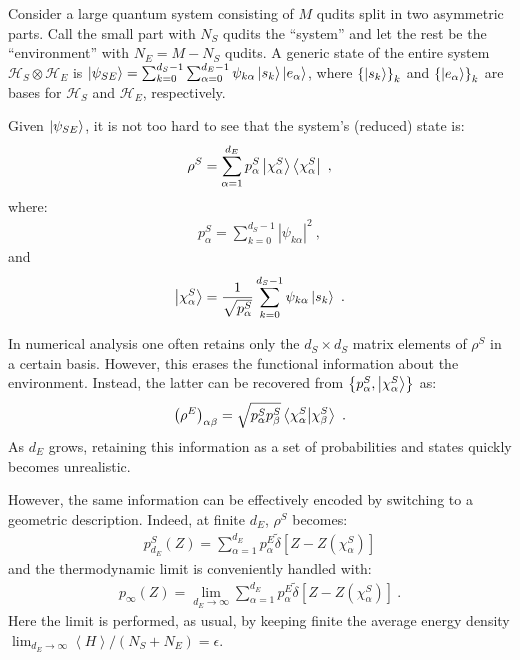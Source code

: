 \documentclass[nofootinbib,pre,twocolumn,showpacs,showkeys,groupaddress,preprintnumbers,floatfix]{revtex4-1}
\newcommand{\1}{\mathbbm{1}}
\newcommand{\MV}[1]{\left\langle #1 \right\rangle}
\begin{document}
Consider a large quantum system consisting of $M$ qudits split in two
asymmetric parts. Call the small part with $N_S$ qudits the ``system'' and
let the rest be the ``environment'' with $N_E = M-N_S$ qudits. A generic state
of the entire system $\mathcal{H}_S \otimes \mathcal{H}_E$ is $\ket{\psi_{SE}}
= \sum_{k=0}^{d_S-1}\sum_{\alpha=0}^{d_E-1}
\psi_{k\alpha}\ket{s_k}\ket{e_\alpha}$, where $\left\{\ket{s_k}\right\}_k$ and
$\left\{\ket{e_\alpha}\right\}_k$ are bases for $\mathcal{H}_S$ and
$\mathcal{H}_E$, respectively.

Given $\ket{\psi_{SE}}$, it is not too hard to see that the system's (reduced) state is:
\begin{align}
\rho^S = \sum_{\alpha=1}^{d_E} p_\alpha^S \ket{\chi_\alpha^S} \bra{\chi_\alpha^S}\label{eq:reducedS}
  ~,
\end{align}
where:
\begin{align*}
p_\alpha^S = \sum_{k=0}^{d_S-1} \left\vert \psi_{k\alpha} \right\vert^2
  ~,
\end{align*}
and
\begin{align*}
\ket{\chi_\alpha^S} = \frac{1}{\sqrt{p_\alpha^S}} \sum_{k=0}^{d_S-1} \psi_{k\alpha}\ket{s_k}
  ~.
\end{align*}

In numerical analysis one often retains only the $d_S \times d_S$ matrix
elements of $\rho^S$ in a certain basis. However, this erases the functional
information about the environment. Instead, the latter can be recovered from
$\left\{ p_\alpha^S, \ket{\chi_\alpha^S}\right\}$ as:
\begin{align*}
\left(\rho^E\right)_{\alpha\beta}
  = \sqrt{p_\alpha^S p_\beta^S}\braket{\chi_\alpha^S}{\chi_\beta^S}
  ~.
\end{align*}
As $d_E$ grows, retaining this information as a set of probabilities and states
quickly becomes unrealistic.

However, the same information can be effectively encoded by switching to a
geometric description. Indeed, at finite $d_E$, $\rho^S$ becomes:
\begin{align*}
p^S_{d_E}(Z) = \sum_{\alpha=1}^{d_E}p_\alpha^E
  \tilde{\delta}\left[ Z - Z(\chi_\alpha^S)\right]
\end{align*}
and the thermodynamic limit is conveniently handled with:
\begin{align*}
p_\infty(Z) = \lim_{d_E \to \infty} \sum_{\alpha=1}^{d_E}
  p_\alpha^E \tilde{\delta}\left[ Z - Z(\chi_\alpha^S)\right]
  ~.
\end{align*}
Here the limit is performed, as usual, by keeping finite the average energy density $\lim_{d_E \to \infty} \MV{H}/(N_S + N_E) = \epsilon$.
\end{document}
